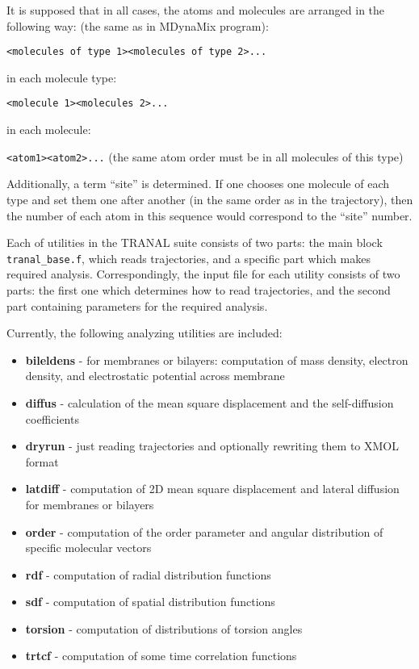 \documentclass{article}
\begin{document}
It is supposed that in all cases, the atoms and molecules are arranged
in the following way: (the same as in MDynaMix program):

\verb|<molecules of type 1><molecules of type 2>...|

in each molecule type:

\verb|<molecule 1><molecules 2>...|

in each molecule:

\verb|<atom1><atom2>...|
(the same atom order must be in all molecules of this type)

Additionally, a term ``site'' is determined. If one chooses one molecule
of each type and set them one after another (in the same order as in the
trajectory), then the number of each atom in this sequence would correspond
to the ``site'' number. 

Each of utilities in the TRANAL suite consists of two parts: the main block 
\verb|tranal_base.f|,
which reads trajectories, and a specific part which makes required 
analysis. Correspondingly, the input file for each utility consists of 
two parts: the first one which determines how to read trajectories, and
the second part containing parameters for the required analysis.

Currently, the following analyzing utilities are included:

\begin{itemize}

\item
{\bf bileldens} - for membranes or bilayers: computation of mass density, 
electron density, and electrostatic potential across membrane

\item
{\bf diffus} - calculation of the mean square displacement and the 
self-diffusion coefficients

\item
{\bf dryrun} - just reading trajectories and optionally rewriting 
them to XMOL format

\item
{\bf latdiff} - computation of 2D mean square displacement and lateral
diffusion for membranes or bilayers

\item
{\bf order} - computation of the order parameter and angular distribution 
of specific molecular vectors 

\item
{\bf rdf} - computation of radial distribution functions

\item
{\bf sdf} - computation of spatial distribution functions

\item
{\bf torsion} - computation of distributions of torsion angles

\item
{\bf trtcf} - computation of some time correlation functions

\end{itemize}
 
\end{document}
